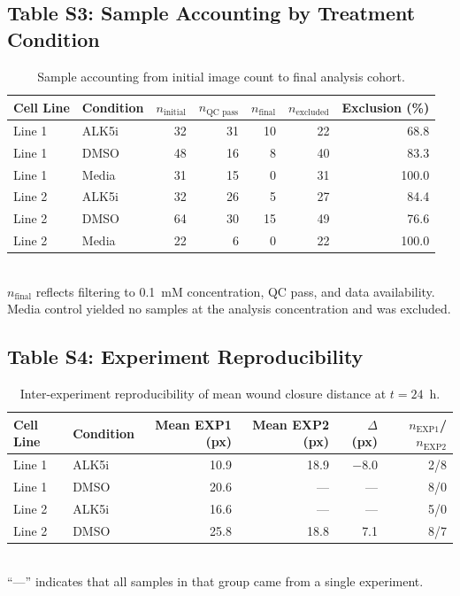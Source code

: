 \subsection*{Table S3: Sample Accounting by Treatment Condition}

\begin{table}[H]
  \centering
  \caption{Sample accounting from initial image count to final analysis cohort.}\label{tab:sample_accounting}
  \begin{tabular}{llrrrrr}
    \toprule
    Cell Line & Condition & $n_\text{initial}$ & $n_\text{QC pass}$ & $n_\text{final}$ & $n_\text{excluded}$ & Exclusion (\%) \\
    \midrule
    Line 1 & ALK5i & 32 & 31 & 10 & 22 & 68.8 \\
    Line 1 & DMSO  & 48 & 16 &  8 & 40 & 83.3 \\
    Line 1 & Media & 31 & 15 &  0 & 31 & 100.0 \\
    \addlinespace
    Line 2 & ALK5i & 32 & 26 &  5 & 27 & 84.4 \\
    Line 2 & DMSO  & 64 & 30 & 15 & 49 & 76.6 \\
    Line 2 & Media & 22 &  6 &  0 & 22 & 100.0 \\
    \bottomrule
  \end{tabular}
  \smallskip\\
  {\small $n_\text{final}$ reflects filtering to 0.1~mM concentration, QC pass, and data availability. Media control yielded no samples at the analysis concentration and was excluded.}
\end{table}

\subsection*{Table S4: Experiment Reproducibility}

\begin{table}[H]
  \centering
  \caption{Inter-experiment reproducibility of mean wound closure distance at $t = 24$~h.}\label{tab:reproducibility}
  \begin{tabular}{llrrrr}
    \toprule
    Cell Line & Condition & Mean EXP1 (px) & Mean EXP2 (px) & $\Delta$ (px) & $n_\text{EXP1}$/$n_\text{EXP2}$ \\
    \midrule
    Line 1 & ALK5i & 10.9 & 18.9 & $-$8.0 & 2/8 \\
    Line 1 & DMSO  & 20.6 & --- & --- & 8/0 \\
    Line 2 & ALK5i & 16.6 & --- & --- & 5/0 \\
    Line 2 & DMSO  & 25.8 & 18.8 & 7.1 & 8/7 \\
    \bottomrule
  \end{tabular}
  \smallskip\\
  {\small ``---'' indicates that all samples in that group came from a single experiment.}
\end{table}

